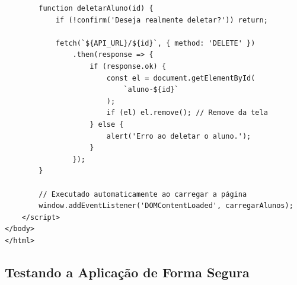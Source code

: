 \documentclass[12pt,a4paper]{article}
\begin{document}
\begin{boxCodigo}
\begin{verbatim}
        function deletarAluno(id) {
            if (!confirm('Deseja realmente deletar?')) return;
            
            fetch(`${API_URL}/${id}`, { method: 'DELETE' })
                .then(response => {
                    if (response.ok) {
                        const el = document.getElementById(
                            `aluno-${id}`
                        );
                        if (el) el.remove(); // Remove da tela
                    } else {
                        alert('Erro ao deletar o aluno.');
                    }
                });
        }

        // Executado automaticamente ao carregar a página
        window.addEventListener('DOMContentLoaded', carregarAlunos);
    </script>
</body>
</html>
\end{verbatim}
\end{boxCodigo}

\subsection*{Testando a Aplicação de Forma Segura}
\end{document}
